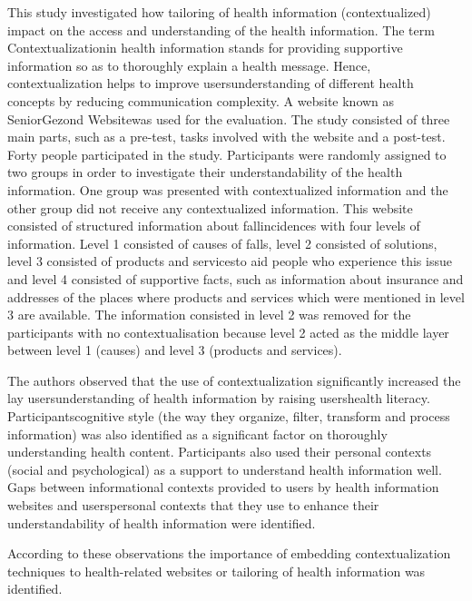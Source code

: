 \documentclass[]{article}
\begin{document}
\begin{enumerate}
This study investigated how tailoring of health information (contextualized) impact on the access and understanding of the health information. The term \textquotesingle Contextualization\textquotesingle in health information stands for providing supportive information so as to thoroughly explain a health message. Hence, contextualization helps to improve users\textquotesingle understanding of different health concepts by reducing communication complexity. A website known as \textquotesingle SeniorGezond Website\textquotesingle was used for the evaluation. The study consisted of three main parts, such as a pre-test, tasks involved with the website and a post-test. Forty people participated in the study. Participants were randomly assigned to two groups in order to investigate their understandability of the health information. One group was presented with contextualized information and the other group did not receive any contextualized information. This website consisted of structured information about \textquotesingle fall\textquotesingle incidences with four levels of information. Level 1 consisted of \textquotesingle causes of falls\textquotesingle, level 2 consisted of \textquotesingle solutions\textquotesingle, level 3 consisted of \textquotesingle products and services\textquotesingle to aid people who experience this issue and level 4 consisted of \textquotesingle supportive facts\textquotesingle, such as information about insurance and addresses of the places where products and services which were mentioned in level 3 are available. The information consisted in level 2 was removed for the participants with no contextualisation because level 2 acted as the middle layer between level 1 (causes) and level 3 (products and services).

The authors observed that the use of contextualization significantly increased the lay users\textquotesingle understanding of health information by raising users\textquotesingle health literacy. Participants\textquotesingle cognitive style (the way they organize, filter, transform and process information) was also identified as a significant factor on thoroughly understanding health content. Participants also used their personal contexts (social and psychological) as a support to understand health information well. Gaps between informational contexts provided to users by health information websites and users\textquotesingle personal contexts that they use to enhance their understandability of health information were identified. 

According to these observations the importance of embedding contextualization techniques to health-related websites or tailoring of health information was identified. \\


\end{enumerate}
\end{document}
